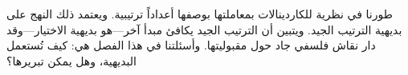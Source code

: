 \documentclass[../../../include/open-logic-section]{subfiles}
\begin{document}


طورنا في 
نظرية للكاردينالات بمعاملتها بوصفها أعداداً ترتيبية. ويعتمد ذلك النهج
على بديهية الترتيب الجيد. ويتبين أن الترتيب الجيد يكافئ مبدأ آخر---هو
بديهية الاختيار---وقد دار نقاش فلسفي جاد حول مقبوليتها. وأسئلتنا في هذا
الفصل هي: كيف تُستعمل البديهية، وهل يمكن تبريرها؟
\end{document}

